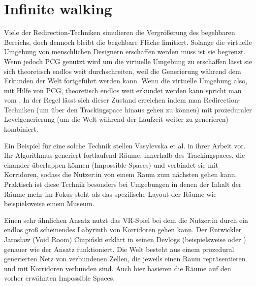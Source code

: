 \section{Infinite walking}
Viele der Redirection-Techniken simulieren die Vergrößerung des begehbaren Bereichs, doch dennoch bleibt die begehbare Fläche limitiert. Solange die virtuelle Umgebung von menschlichen Designern erschaffen werden muss ist sie begrenzt. Wenn jedoch PCG genutzt wird um die virtuelle Umgebung zu erschaffen lässt sie sich theoretisch endlos weit durchschreiten, weil die Generierung während dem Erkunden der Welt fortgeführt werden kann.
Wenn die virtuelle Umgebung also, mit Hilfe von PCG, theoretisch endlos weit erkundet werden kann spricht man vom .
In der Regel lässt sich dieser Zustand %
erreichen indem man Redirection-Techniken (um über den Trackingspace hinaus gehen zu können) mit prozeduraler Levelgenerierung (um die Welt während der Laufzeit weiter zu generieren) kombiniert.

Ein Beispiel für eine solche Technik stellen Vasylevska et al. in ihrer Arbeit \cite{flexible-spaces} vor. Ihr Algorithmus generiert fortlaufend Räume, innerhalb des Trackingspaces, die einander überlappen können (Impossible-Spaces) und verbindet sie mit Korridoren, sodass die Nutzer:in von einem Raum zum nächsten gehen kann. Praktisch ist diese Technik besonders bei Umgebungen in denen der Inhalt der Räume mehr im Fokus steht als das spezifische Layout der Räume wie beispielsweise einem Museum.

Einen sehr ähnlichen Ansatz nutzt das VR-Spiel  \cite{tea-for-god} bei dem die Nutzer:in durch ein endlos groß scheinendes Labyrinth von Korridoren gehen kann. Der Entwickler Jarosław (Void Room) Ciupiński erklärt in seinen Devlogs (beispielsweise \cite{tea-for-god-devlog-a} oder \cite{tea-for-god-devlog-b}) genauer wie der Ansatz funktioniert.
Die Welt besteht aus einem prozedural generierten Netz von verbundenen Zellen, die jeweils einen Raum repräsentieren und mit Korridoren verbunden sind. Auch hier basieren die Räume auf den vorher erwähnten Impossible Spaces.

